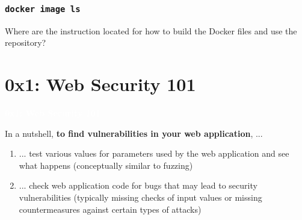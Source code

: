 \documentclass[aspectratio=169]{beamer}
\begin{document}
\begin{frame}
    \frametitle{\texttt{docker image ls}}
    Where are the instruction located for how to build the Docker files and use the repository?
\end{frame}



\section{0x1: Web Security 101}

{
\begin{frame}
\huge{\textcolor{white}{\textbf{0x1: Web Security 101}}}
\end{frame}
}

\begin{frame}
    In a nutshell, \textbf{to find vulnerabilities in your web application}, ...
    \begin{enumerate}
        \item ... test various values for parameters used by the web application and see what happens (conceptually similar to fuzzing)
        \item ... check web application code for bugs that may lead to security vulnerabilities (typically missing checks of input values or missing countermeasures against certain types of attacks)
    \end{enumerate}
\end{frame}
\end{document}
